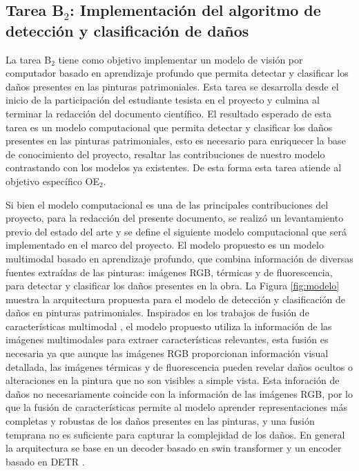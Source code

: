 \subsection{Tarea B$_2$: Implementación del algoritmo de detección y clasificación de daños}

La tarea B$_2$ tiene como objetivo implementar un modelo de visión por computador basado en aprendizaje profundo que permita detectar y clasificar 
los daños presentes en las pinturas patrimoniales. Esta tarea se desarrolla desde el inicio de la participación del estudiante tesista en el 
proyecto y culmina al terminar la redacción del documento científico. El resultado esperado de esta tarea es un modelo computacional que permita 
detectar y clasificar los daños presentes en las pinturas patrimoniales, esto es necesario para enriquecer la base de conocimiento del proyecto, 
resaltar las contribuciones de nuestro modelo contrastando con los modelos ya existentes. De esta forma esta tarea atiende al objetivo específico OE$_2$.

Si bien el modelo computacional es una de las principales contribuciones del proyecto, para la redacción del presente documento, se realizó un levantamiento
previo del estado del arte y se define el siguiente modelo computacional que será implementado en el marco del proyecto. 
El modelo propuesto es un modelo multimodal basado en aprendizaje profundo, que combina información de diversas fuentes extraídas de las pinturas: 
imágenes RGB, térmicas y de fluorescencia, para detectar y clasificar los daños presentes en la obra. La Figura \ref{fig:modelo} muestra la arquitectura 
propuesta para el modelo de detección y clasificación de daños en pinturas patrimoniales. Inspirados en los trabajos de fusión de características 
multimodal \citep{li2026video, Iaboni_2026_CVPR}, el modelo propuesto utiliza la información de las imágenes multimodales para extraer 
características relevantes, esta fusión es necesaria ya que aunque las imágenes RGB proporcionan información visual detallada, las imágenes 
térmicas y de fluorescencia pueden revelar daños ocultos o alteraciones en la pintura que no son visibles a simple vista. 
Esta inforación de daños no  necesariamente coincide con la información de las imágenes RGB, por lo que la fusión de características permite al 
modelo aprender representaciones más completas y robustas de los daños presentes en las pinturas, y una fusión temprana no es suficiente para capturar 
la complejidad de los daños. En general la arquitectura se base en un decoder basado en swin transformer \citep{liu2021swin} y 
un encoder basado en DETR \citep{carion2020end}. 


